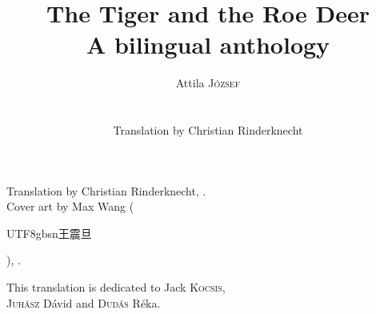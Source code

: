 \documentclass[11pt]{book}
\title{The Tiger and the Roe Deer\\ {\large A bilingual anthology}}
\author{{\Large Attila \textsc{József}}\\\\\\
Translation by Christian Rinderknecht}
\date{\oldstylenums{2026}}
\newcommand*{\centeredornament}{\centerline{\pgfornament[width=6cm]{88}}}
\newcommand{\zh}[1]{\begin{CJK}{UTF8}{gbsn}#1\end{CJK}}
\begin{document}


\thispagestyle{empty}

\mbox{}
\thispagestyle{empty}

\newpage\leavevmode\thispagestyle{empty}

\mbox{}
\thispagestyle{empty}

\maketitle

\thispagestyle{empty}

\vspace*{\fill}

\begin{flushright}
  \textcopyright{} Translation by Christian Rinderknecht,
  .\\
  \textcopyright{} Cover art by Max Wang (\zh{王震旦}), .
\end{flushright}

\newpage

\vspace*{4cm}

\begin{flushright}
  This translation is dedicated to Jack \textsc{Kocsis}, \\
  \textsc{Juhász} Dávid and \textsc{Dudás} Réka.
\end{flushright}

\thispagestyle{empty}

\newpage\leavevmode\thispagestyle{empty}\newpage

\thispagestyle{empty}

\def\contentsname{\empty}
\tableofcontents

\thispagestyle{empty}
\newpage
\leavevmode\thispagestyle{empty}
\newpage
\clearpage


\vspace*{-15mm}
\centeredornament



\label{only_you_should_read_my_poems}
\end{document}
